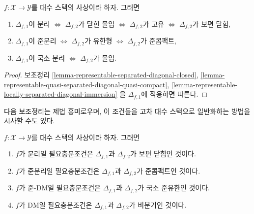 \begin{lemma}
\label{lemma-first-diagonal-separated-second-diagonal-closed}
$f : \mathcal{X} \to \mathcal{Y}$를 대수 스택의 사상이라 하자. 그러면
\begin{enumerate}
\item $\Delta_{f, 1}$이 분리 $\Leftrightarrow$
$\Delta_{f, 2}$가 닫힌 몰입 $\Leftrightarrow$
$\Delta_{f, 2}$가 고유 $\Leftrightarrow$
$\Delta_{f, 2}$가 보편 닫힘,
\item $\Delta_{f, 1}$이 준분리 $\Leftrightarrow$
$\Delta_{f, 2}$가 유한형 $\Leftrightarrow$ $\Delta_{f, 2}$가 준콤팩트,
\item $\Delta_{f, 1}$이 국소 분리 $\Leftrightarrow$
$\Delta_{f, 2}$가 몰입.
\end{enumerate}
\end{lemma}

\begin{proof}
보조정리 \ref{lemma-representable-separated-diagonal-closed},
\ref{lemma-representable-quasi-separated-diagonal-quasi-compact},
\ref{lemma-representable-locally-separated-diagonal-immersion}
을 $\Delta_{f, 1}$에 적용하면 따른다.
\end{proof}

\noindent
다음 보조정리는 제법 흥미로우며, 이 조건들을 고차 대수 스택으로
일반화하는 방법을 시사할 수도 있다.

\begin{lemma}
\label{lemma-definition-separated}
$f : \mathcal{X} \to \mathcal{Y}$를 대수 스택의 사상이라 하자. 그러면
\begin{enumerate}
\item $f$가 분리일 필요충분조건은 $\Delta_{f, 1}$과 $\Delta_{f, 2}$가
보편 닫힘인 것이다.
\item $f$가 준분리일 필요충분조건은 $\Delta_{f, 1}$과 $\Delta_{f, 2}$가
준콤팩트인 것이다.
\item $f$가 준-DM일 필요충분조건은 $\Delta_{f, 1}$과 $\Delta_{f, 2}$가
국소 준유한인 것이다.
\item $f$가 DM일 필요충분조건은 $\Delta_{f, 1}$과 $\Delta_{f, 2}$가
비분기인 것이다.
\end{enumerate}
\end{lemma}

